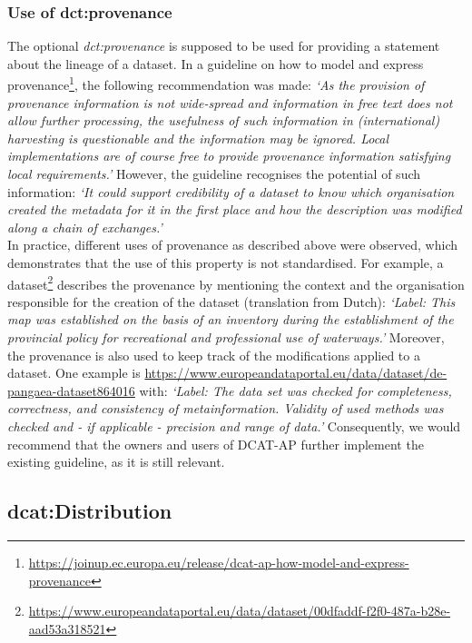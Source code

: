 \documentclass[<options>]{elsarticle}
\begin{document}
\subsubsection{Use of dct:provenance}
The optional \textit{dct:provenance} is supposed to be used for providing a statement about the lineage of a dataset. In a guideline on how to model and express provenance\footnote{\href{  https://joinup.ec.europa.eu/release/dcat-ap-how-model-and-express-provenance}{  https://joinup.ec.europa.eu/release/dcat-ap-how-model-and-express-provenance}}, the following recommendation was made: \textit{‘As the provision of provenance information is not wide-spread and information in free text does not allow further processing, the usefulness of such information in (international) harvesting is questionable and the information may be ignored. Local implementations are of course free to provide provenance information satisfying local requirements.’ }However, the guideline recognises the potential of such information: \textit{‘It could support credibility of a dataset to know which organisation created the metadata for it in the first place and how the description was modified along a chain of exchanges.’}\\
In practice, different uses of provenance as described above were observed, which demonstrates that the use of this property is not standardised. For example, a dataset\footnote{\href{  https://www.europeandataportal.eu/data/dataset/00dfaddf-f2f0-487a-b28e-aad53a318521}{https://www.europeandataportal.eu/data/dataset/00dfaddf-f2f0-487a-b28e-aad53a318521}} describes the provenance by mentioning the context and the organisation responsible for the creation of the dataset (translation from Dutch): \textit{‘Label: This map was established on the basis of an inventory during the establishment of the provincial policy for recreational and professional use of waterways.’}
Moreover, the provenance is also used to keep track of the modifications applied to a dataset. One example is \url{https://www.europeandataportal.eu/data/dataset/de-pangaea-dataset864016} with: \textit{‘Label: The data set was checked for completeness, correctness, and consistency of metainformation. Validity of used methods was checked and - if applicable - precision and range of data.’} Consequently, we would recommend that the owners and users of DCAT-AP further implement the existing guideline, as it is still relevant.

\subsection{dcat:Distribution}
\end{document}
